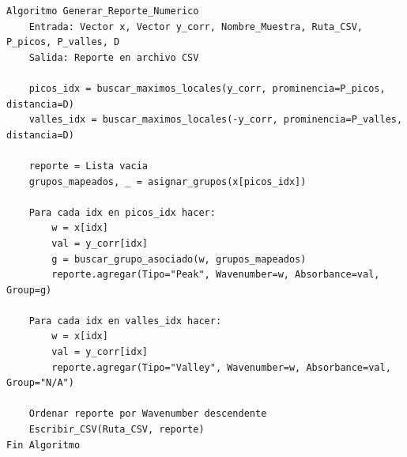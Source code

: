\begin{lstlisting}[caption=Algoritmo de Deteccion de Extremos y Generacion de Reportes]
Algoritmo Generar_Reporte_Numerico
    Entrada: Vector x, Vector y_corr, Nombre_Muestra, Ruta_CSV, P_picos, P_valles, D
    Salida: Reporte en archivo CSV

    picos_idx = buscar_maximos_locales(y_corr, prominencia=P_picos, distancia=D)
    valles_idx = buscar_maximos_locales(-y_corr, prominencia=P_valles, distancia=D)
    
    reporte = Lista vacia
    grupos_mapeados, _ = asignar_grupos(x[picos_idx])
    
    Para cada idx en picos_idx hacer:
        w = x[idx]
        val = y_corr[idx]
        g = buscar_grupo_asociado(w, grupos_mapeados)
        reporte.agregar(Tipo="Peak", Wavenumber=w, Absorbance=val, Group=g)
        
    Para cada idx en valles_idx hacer:
        w = x[idx]
        val = y_corr[idx]
        reporte.agregar(Tipo="Valley", Wavenumber=w, Absorbance=val, Group="N/A")
        
    Ordenar reporte por Wavenumber descendente
    Escribir_CSV(Ruta_CSV, reporte)
Fin Algoritmo
\end{lstlisting}